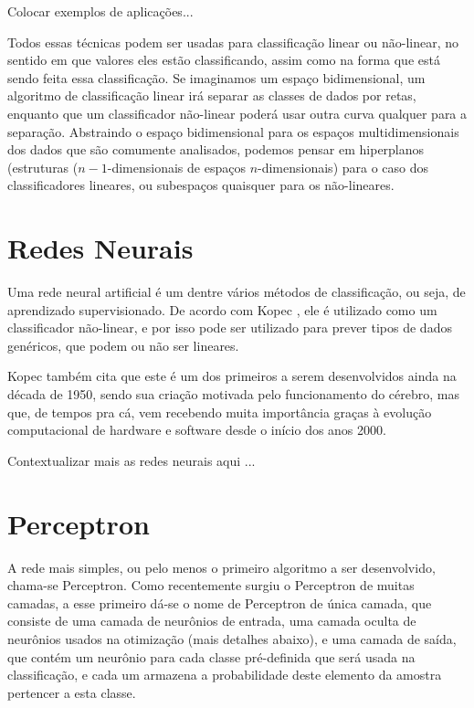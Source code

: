 Colocar exemplos de aplicações...

Todos essas técnicas podem ser usadas para classificação linear ou não-linear, no sentido em que valores eles estão classificando, assim como na forma que está sendo feita essa classificação. Se imaginamos um espaço bidimensional, um algoritmo de classificação linear irá separar as classes de dados por retas, enquanto que um classificador não-linear poderá usar outra curva qualquer para a separação. Abstraindo o espaço bidimensional para os espaços multidimensionais dos dados que são comumente analisados, podemos pensar em hiperplanos (estruturas ($n{-}1$-dimensionais de espaços $n$-dimensionais) para o caso dos classificadores lineares, ou subespaços quaisquer para os não-lineares.

\section{Redes Neurais}

Uma rede neural artificial é um dentre vários métodos de classificação, ou seja, de aprendizado supervisionado. De acordo com Kopec \citep{classic}, ele é utilizado como um classificador não-linear, e por isso pode ser utilizado para prever tipos de dados genéricos, que podem ou não ser lineares. 

Kopec \citep{classic} também cita que este é um dos primeiros a serem desenvolvidos ainda na década de 1950, sendo sua criação motivada pelo funcionamento do cérebro, mas que, de tempos pra cá, vem recebendo muita importância graças à evolução computacional de hardware e software desde o início dos anos 2000.

Contextualizar mais as redes neurais aqui ...

\section{Perceptron}

A rede mais simples, ou pelo menos o primeiro algoritmo a ser desenvolvido, chama-se Perceptron. Como recentemente surgiu o Perceptron de muitas camadas, a esse primeiro dá-se o nome de Perceptron de única camada, que consiste de uma camada de neurônios de entrada, uma camada oculta de neurônios usados na otimização (mais detalhes abaixo), e uma camada de saída, que contém um neurônio para cada classe pré-definida que será usada na classificação, e cada um armazena a probabilidade deste elemento da amostra pertencer a esta classe.

